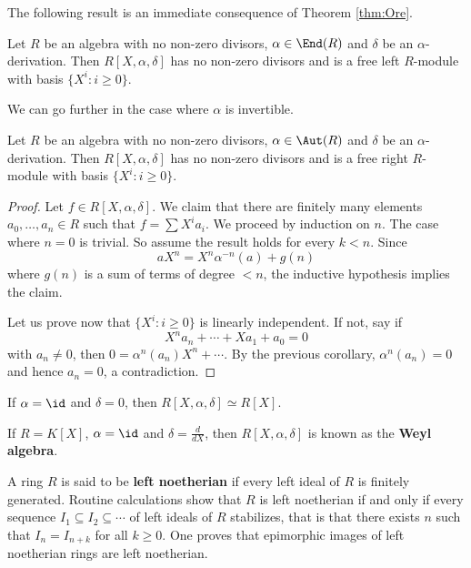 The following result is an immediate consequence of Theorem \ref{thm:Ore}.

\begin{corollary}
    Let $R$ be an algebra with no non-zero divisors, $\alpha\in\End(R)$ and 
    $\delta$ be an $\alpha$-derivation. Then $R[X,\alpha,\delta]$ has no non-zero divisors 
    and is a free left $R$-module with basis 
    $\{X^i:i\geq 0\}$. 
\end{corollary}

We can go further in the case where $\alpha$ is invertible. 

\begin{corollary}
    Let $R$ be an algebra with no non-zero divisors, $\alpha\in\Aut(R)$ and 
    $\delta$ be an $\alpha$-derivation. Then $R[X,\alpha,\delta]$ has no non-zero divisors 
    and is a free right $R$-module with basis 
    $\{X^i:i\geq 0\}$. 
\end{corollary}

\begin{proof}
    Let $f\in R[X,\alpha,\delta]$. We claim that there are finitely many 
    elements $a_0,\dots,a_n\in R$ 
    such that $f=\sum X^ia_i$. We proceed by induction on $n$. The case where $n=0$ is trivial. So assume
    the result holds for every $k<n$. Since  
    \[
    aX^n=X^n\alpha^{-n}(a)+g(n)
    \]
    where $g(n)$ is a sum of terms of degree $<n$, 
    the inductive hypothesis implies the claim. 

    Let us prove now that $\{X^i:i\geq 0\}$ is linearly independent. If not, say 
    if \[
    X^na_n+\cdots+Xa_1+a_0=0
    \]
    with $a_n\ne 0$, then 
    $0=\alpha^n(a_n)X^n+\cdots$. 
    By the previous corollary, $\alpha^n(a_n)=0$ and hence $a_n=0$, a contradiction. 
\end{proof}

\begin{example}
    If $\alpha=\id$ and $\delta=0$, then $R[X,\alpha,\delta]\simeq R[X]$. 
\end{example}

\begin{example}
    If $R=K[X]$, $\alpha=\id$ and $\delta=\frac{d}{dX}$, then 
    $R[X,\alpha,\delta]$ is known as the \textbf{Weyl algebra}. 
\end{example}

A ring $R$ is said to be \textbf{left noetherian} if 
every left ideal of $R$ is finitely generated. Routine calculations show
that $R$ is left noetherian if and only if
every sequence 
$I_1\subseteq I_2\subseteq\cdots$
of left ideals of $R$ stabilizes, that is that there exists $n$ such that 
$I_n=I_{n+k}$ for all $k\geq0$. One proves that epimorphic images of left noetherian rings
are left noetherian. 

